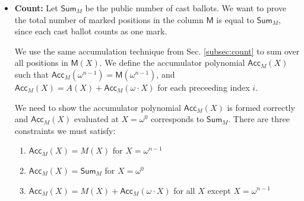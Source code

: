 \begin{itemize}
  If there is only one mark per ballot, the evaluations of $\mathsf{S}_{\mathsf{blk}_M}(X)$ on the domain $\Omega$ correspond to 0 or 1. We need to prove $\mathsf{S}_{\mathsf{blk}_M}(X)$ was constructed correctly, so we define a vanishing polynomial that satisfies this constraint as:
  \begin{equation}
    \label{eq:10}
    \mathsf{P_{vanish10}}(X)= (\mathsf{S_{blk}}(X) - \sum_{i=0}^{n-1}\mathsf{M}(X\cdot\omega^i)).
  \end{equation}
  
  Now we need to show $\mathsf{S}_{\mathsf{blk}_M}(X)$ corresponds to $\{0,1\}$. Enforcing this constraint is identical to enforcing the \emph{values} constraint. We multiply the roots to form the domain vanishing polynomial defined as:
  \begin{equation}
    \label{eq:11}
  \mathsf{P_{vanish11}}(X) = \mathsf{S}_{\mathsf{blk}_M}(X) \cdot (\mathsf{S}_{\mathsf{blk}_M}(X)-1).
  \end{equation}
  This zeros out the polynomial on the evaluation domain iff the mark column contains at most one mark per every $\mathcal{C}$th block. 

  \item \textbf{Count:} Let $\mathsf{Sum}_M$ be the public number of cast ballots. We want to prove the total number of marked positions in the column $\mathsf{M}$ is equal to $\mathsf{Sum}_M$, since each cast ballot counts as one mark. 
  
  We use the same accumulation technique from Sec. \ref{subsec:count} to sum over all positions in $\mathsf{M}(X)$. We define the accumulator polynomial $\mathsf{Acc}_M(X)$ such that $\mathsf{Acc}_M(\omega^{n-1}) = \mathsf{M}(\omega^{n-1})$, 
  and $\mathsf{Acc}_M(X) = A(X) + \mathsf{Acc}_M(\omega\cdot X)$ for each preceeding index $i$.

  We need to show the accumulator polynomial $\mathsf{Acc}_M(X)$ is formed correctly and $\mathsf{Acc}_M(X)$ evaluated at $X=\omega^0$ corresponds to $\mathsf{Sum}_M$.
  There are three constraints we must satisfy:
  \begin{enumerate}
    \item $\mathsf{Acc}_M(X)=M(X)$ for $X = \omega^{n-1}$
    \item $\mathsf{Acc}_M(X)=\mathsf{Sum}_M$ for $X=\omega^0$
    \item $\mathsf{Acc}_M(X) = M(X)+\mathsf{Acc}_M(\omega\cdot X)$ for all $X$ except $X=\omega^{n-1}$
  \end{enumerate}


\end{itemize}

